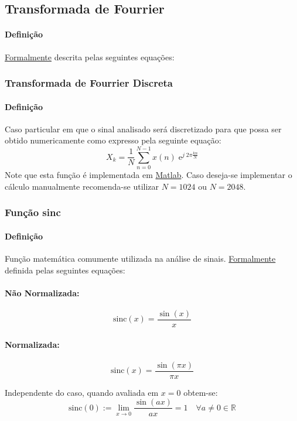 \documentclass{article}
\begin{document}
\subsection{Transformada de Fourrier}
    \paragraph{Definição}\href{https://en.wikipedia.org/wiki/Fourier_transform}{Formalmente} descrita pelas seguintes equações:

\subsubsection{Transformada de Fourrier Discreta}
    \paragraph{Definição}Caso particular em que o sinal analisado será discretizado para que possa ser obtido numericamente como expresso pela seguinte equação:
    \begin{equation}
        \boxed{X_k = \frac{1}{N} \sum_{n=0}^{N-1} x(n)\;\text{e}^{j\;2\pi \frac{kn}{N}}}
    \end{equation}
    Note que esta função é implementada em \href{https://www.mathworks.com/help/matlab/ref/fft.html}{Matlab}. Caso deseja-se implementar o cálculo manualmente recomenda-se utilizar $N = 1024$ ou $N = 2048$.

\subsubsection{Função sinc}
    \paragraph{Definição}Função matemática comumente utilizada na análise de sinais. \href{https://en.wikipedia.org/wiki/Sinc_function}{Formalmente} definida pelas seguintes equações:
    \begin{multicols}{2}
        \raggedcolumns
        \paragraph{Não Normalizada:}
        \begin{equation}
        \boxed{\text{sinc}(x) = \frac{\sin(x)}{x}}
        \end{equation}
        \columnbreak
        \paragraph{Normalizada:}
        \begin{equation}
        \boxed{\text{sinc}(x) = \frac{\sin(\pi x)}{\pi x}}
        \end{equation}
    \end{multicols}\noindent
    Independente do caso, quando avaliada em $x = 0$ obtem-se:
    \begin{equation*}
        \text{sinc}(0) := \lim_{x\to 0}\frac{\sin(ax)}{ax} = 1 \quad\forall a\neq 0 \in\mathbb{R}
    \end{equation*}
\end{document}
